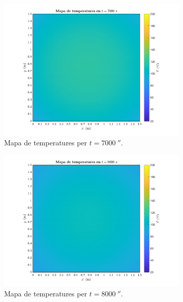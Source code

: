 \begin{figure}[ht]
	\centering
	\begin{subfigure}{.5\textwidth}
		\centering
		\includegraphics[width=.95\linewidth]{imagenes/06_canvi_condicions_contorn/t_7000.pdf}
		\vspace{-10pt}
		\caption{Mapa de temperatures per $t = 7000 \ \second$.}
		\label{fig:nou_t_7000}
	\end{subfigure}%
	\begin{subfigure}{.5\textwidth}
		\centering
		\includegraphics[width=.95\linewidth]{imagenes/06_canvi_condicions_contorn/t_8000.pdf}
		\vspace{-10pt}
		\caption{Mapa de temperatures per $t = 8000 \ \second$.}
		\label{fig:nou_t_8000}
	\end{subfigure}
	\begin{subfigure}{.5\textwidth}

\end{subfigure}
\end{figure}
